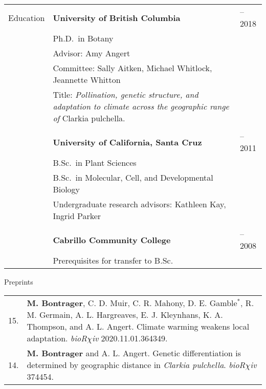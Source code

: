 \documentclass[letterpaper,11pt,oneside]{article}
\begin{document}
\noindent \begin{tabular}{@{} p{3cm} p{12cm} >{\raggedleft\arraybackslash}p{1.7cm}}
\Large{Education}    & \textbf{University of British Columbia} & 2012--2018 \\
& Ph.D.\ in Botany & \\
& \raggedright{Advisor: Amy Angert} & \\
& \raggedright{Committee: Sally Aitken, Michael Whitlock, Jeannette Whitton} &\\ 
& \raggedright{Title: \textit{Pollination, genetic structure, and adaptation to climate across the geographic range of} Clarkia pulchella.} &\\
& & \\
& \textbf{University of California, Santa Cruz} & 2008--2011 \\
& B.Sc.\ in Plant Sciences & \\
& B.Sc.\ in Molecular, Cell, and Developmental Biology & \\
& Undergraduate research advisors: Kathleen Kay, Ingrid Parker  & \\
& & \\
& \textbf{Cabrillo Community College} &  2007--2008 \\
& Prerequisites for transfer to B.Sc. & \\
\end{tabular}
\bigskip






\noindent\Large{Preprints} 
\normalsize
\medskip

\def\arraystretch{1.4}
\noindent \begin{tabular}{@{} p{0.5cm} >{\raggedright\arraybackslash}p{16.7cm}}
15. & \textbf{M. Bontrager}, C. D. Muir, C. R. Mahony, D. E. Gamble$^{*}$, R. M. Germain, A. L. Hargreaves, E. J. Kleynhans, K. A. Thompson, and A. L. Angert. Climate warming weakens local adaptation. \textit{bioR$\chi$iv} 2020.11.01.364349.\\
14. & \textbf{M. Bontrager} and A. L. Angert. Genetic differentiation is determined by geographic distance in \textit{Clarkia pulchella}. \textit{bioR$\chi$iv} 374454. \\
\end{tabular}

\bigskip
\end{document}
